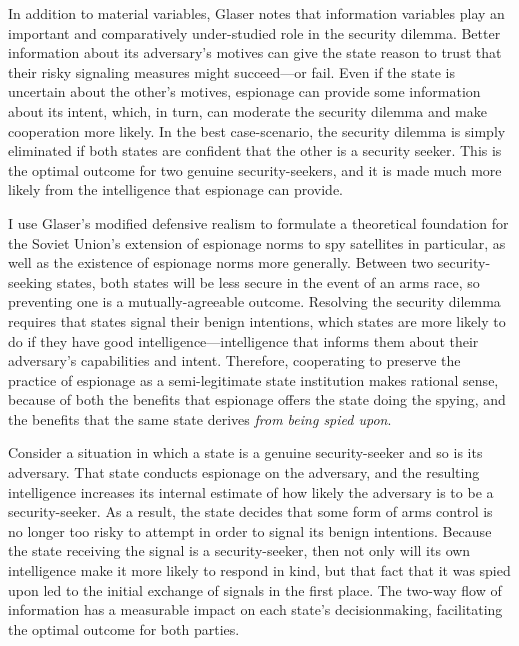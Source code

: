 \documentclass[11pt]{memoir}
\begin{document}
\begin{refsegment}
In addition to material variables, Glaser notes that information variables play an important and comparatively under-studied role in the security dilemma. Better information about its adversary's motives can give the state reason to trust that their risky signaling measures might succeed---or fail. Even if the state is uncertain about the other's motives, espionage can provide some information about its intent, which, in turn, can moderate the security dilemma and make cooperation more likely. In the best case-scenario, the security dilemma is simply eliminated if both states are confident that the other is a security seeker. This is the optimal outcome for two genuine security-seekers, and it is made much more likely from the intelligence that espionage can provide.

I use Glaser's modified defensive realism to formulate a theoretical foundation for the Soviet Union's extension of espionage norms to spy satellites in particular, as well as the existence of espionage norms more generally. Between two security-seeking states, both states will be less secure in the event of an arms race, so preventing one is a mutually-agreeable outcome. Resolving the security dilemma requires that states signal their benign intentions, which states are more likely to do if they have good intelligence---intelligence that informs them about their adversary's capabilities and intent. Therefore, cooperating to preserve the practice of espionage as a semi-legitimate state institution makes rational sense, because of both the benefits that espionage offers the state doing the spying, and the benefits that the same state derives \emph{from being spied upon}.

Consider a situation in which a state is a genuine security-seeker and so is its adversary. That state conducts espionage on the adversary, and the resulting intelligence increases its internal estimate of how likely the adversary is to be a security-seeker. As a result, the state decides that some form of arms control is no longer too risky to attempt in order to signal its benign intentions. Because the state receiving the signal is a security-seeker, then not only will its own intelligence make it more likely to respond in kind, but that fact that it was spied upon led to the initial exchange of signals in the first place. The two-way flow of information has a measurable impact on each state's decisionmaking, facilitating the optimal outcome for both parties.



\end{refsegment}
\end{document}
